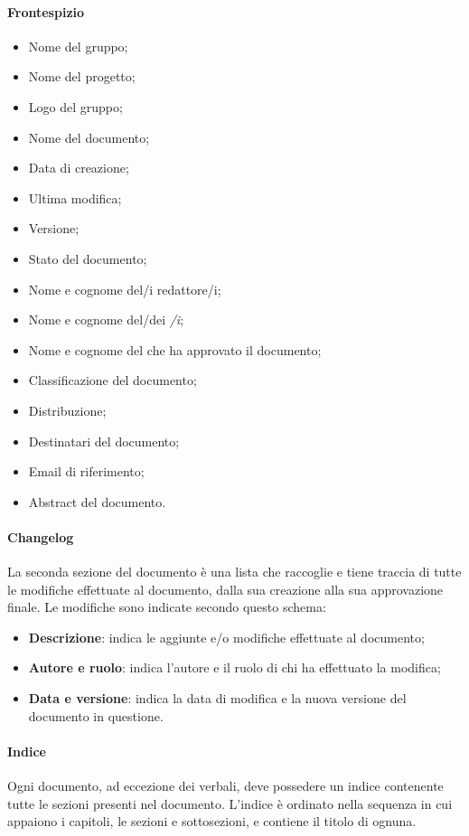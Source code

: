 			\paragraph{Frontespizio}
			\begin{itemize}
				\item{Nome del gruppo;}
				\item{Nome del progetto;}
				\item{Logo del gruppo;}
				\item{Nome del documento;}
				\item{Data di creazione;}
				\item{Ultima modifica;}
				\item{Versione;}
				\item{Stato del documento;}
				\item{Nome e cognome del/i redattore/i;}
				\item{Nome e cognome del/dei \textit{\Ver/i};}
				\item{Nome e cognome del \textit{\RdP} che ha approvato il documento;}
				\item{Classificazione del documento;}
				\item{Distribuzione;}
				\item{Destinatari del documento;}
				\item{Email di riferimento;}
				\item{Abstract del documento.}
			\end{itemize}
	
			\paragraph{Changelog}
			La seconda sezione del documento è una lista che raccoglie e tiene traccia di tutte le modifiche effettuate al documento, dalla sua creazione alla sua approvazione finale. Le modifiche sono indicate secondo questo schema:
			\begin{itemize}
				\item\textbf{Descrizione}: indica le aggiunte e/o modifiche effettuate al documento;
				\item\textbf{Autore e ruolo}: indica l'autore e il ruolo di chi ha effettuato la modifica;
				\item\textbf{Data e versione}: indica la data di modifica e la nuova versione del documento in questione.
			\end{itemize}	

			\paragraph{Indice}
			Ogni documento, ad eccezione dei verbali, deve possedere un indice contenente tutte le sezioni presenti nel documento. L'indice è ordinato nella sequenza in cui appaiono i capitoli, le sezioni e sottosezioni, e contiene il titolo di ognuna. 
			\begin{comment}
			Se nel documento sono presenti immagini o tabelle, occorre indicarle con il relativo indice.
			\end{comment}
			
